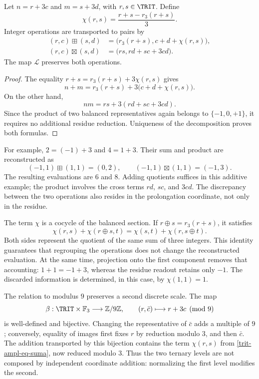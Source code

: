 \begin{proposition}
\label{trit-ampl-prop-aritmetica}
Let \(n=r+3c\) and \(m=s+3d\), with \(r,s\in\TRIT\). Define
\[
 \chi(r,s)=\frac{r+s-r_3(r+s)}3.
\]
Integer operations are transported to pairs by
\begin{align}
 (r,c)\boxplus(s,d)
 &=\bigl(r_3(r+s),c+d+\chi(r,s)\bigr),
 \label{trit-ampl-eq-suma}\\
 (r,c)\boxtimes(s,d)
 &=\bigl(rs,rd+sc+3cd\bigr).
 \label{trit-ampl-eq-producto}
\end{align}
The map \(\mathcal L\) preserves both operations.
\end{proposition}
\begin{proof}
The equality \(r+s=r_3(r+s)+3\chi(r,s)\) gives
\[
 n+m=r_3(r+s)+3\bigl(c+d+\chi(r,s)\bigr).
\]
On the other hand,
\[
 nm=rs+3(rd+sc+3cd).
\]
Since the product of two balanced representatives again belongs to
\(\{-1,0,+1\}\), it requires no additional residue reduction. Uniqueness
of the decomposition proves both formulas.
\end{proof}

For example, \(2=(-1)+3\) and \(4=1+3\). Their sum and product are reconstructed
as
\[
 (-1,1)\boxplus(1,1)=(0,2),\qquad
 (-1,1)\boxtimes(1,1)=(-1,3).
\]
The resulting evaluations are \(6\) and \(8\). Adding quotients suffices
in this additive example; the product involves the cross terms
\(rd\), \(sc\), and \(3cd\). The discrepancy between the two operations
also resides in the prolongation coordinate, not only in the residue.

The term \(\chi\) is a cocycle of the balanced section. If
\(r\oplus s=r_3(r+s)\), it satisfies
\[
 \chi(r,s)+\chi(r\oplus s,t)
 =\chi(s,t)+\chi(r,s\oplus t).
\]
Both sides represent the quotient of the same sum of three integers.
This identity guarantees that regrouping the operations does not change the
reconstructed evaluation. At the same time, projection onto the first
component removes that accounting: \(1+1=-1+3\), whereas the residue
readout retains only \(-1\). The discarded information is
determined, in this case, by \(\chi(1,1)=1\).

The relation to modulus \(9\) preserves a second discrete scale.
The map
\[
 \beta:\TRIT\times\mathbb F_3\longrightarrow\mathbb Z/9\mathbb Z,
 \qquad (r,\bar c)\longmapsto r+3c\pmod9
\]
is well-defined and bijective. Changing the representative of \(\bar c\)
adds a multiple of \(9\); conversely, equality of images first fixes
\(r\) by reduction modulo \(3\), and then \(\bar c\). The addition
transported by this bijection contains the term
\(\chi(r,s)\) from \eqref{trit-ampl-eq-suma}, now reduced modulo \(3\).
Thus the two ternary levels are not composed by independent
coordinate addition: normalizing the first level modifies
the second.

